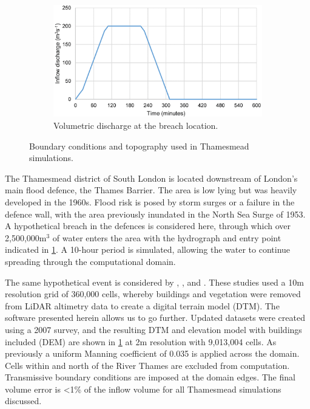 \documentclass[11pt,english,a4paper]{article}
\begin{document}
\begin{figure}[tpb]
    \begin{subfigure}[t]{0.7\textwidth}
        \centering
        \includegraphics[width=1.0\textwidth]{Thamesmead_Inflow.png}
        \caption{Volumetric discharge at the breach location.}
    \end{subfigure}
\caption{Boundary conditions and topography used in Thamesmead simulations.}
\label{Thamesmead_Conditions}
\end{figure}

The Thamesmead district of South London is located downstream of London's main flood defence, the Thames Barrier. The area is low lying but was heavily developed in the 1960s. Flood risk is posed by storm surges or a failure in the defence wall, with the area previously inundated in the North Sea Surge of 1953. A hypothetical breach in the defences is considered here, through which over 2,500,000m$^{3}$ of water enters the area with the hydrograph and entry point indicated in \ref{Thamesmead_Conditions}. A 10-hour period is simulated, allowing the water to continue spreading through the computational domain. 

The same hypothetical event is considered by \citet{Liang2008a}, \citet{Liang2010a}, and \citet{Vacondio2012}. These studies used a 10m resolution grid of 360,000 cells, whereby buildings and vegetation were removed from LiDAR altimetry data to create a digital terrain model (DTM). The software presented herein allows us to go further. Updated datasets were created using a 2007 survey, and the resulting DTM and elevation model with buildings included (DEM) are shown in \ref{Thamesmead_Conditions} at 2m resolution with 9,013,004 cells. As previously a uniform Manning coefficient of 0.035 is applied across the domain. Cells within and north of the River Thames are excluded from computation. Transmissive boundary conditions are imposed at the domain edges. The final volume error is \textless1\% of the inflow volume for all Thamesmead simulations discussed.
\end{document}
